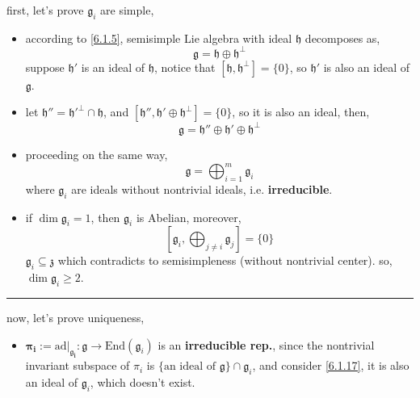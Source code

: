\begin{itemize}
	\begin{tcolorbox}[title=proof:]
		first, let's prove $\mathfrak{g}_i$ are simple,
		\begin{itemize}
			\item according to \eqref{6.1.5}, semisimple Lie algebra with ideal $\mathfrak{h}$ decomposes as,
			\begin{equation}
				\mathfrak{g} = \mathfrak{h} \oplus \mathfrak{h}^\perp
			\end{equation}
			suppose $\mathfrak{h}'$ is an ideal of $\mathfrak{h}$, notice that $[\mathfrak{h}, \mathfrak{h}^\perp] = \{0\}$, so $\mathfrak{h}'$ is also an ideal of $\mathfrak{g}$.
			
			\item let $\mathfrak{h}'' = \mathfrak{h}'^\perp \cap \mathfrak{h}$, and $[\mathfrak{h}'', \mathfrak{h}' \oplus \mathfrak{h}^\perp] = \{0\}$, so it is also an ideal, then,
			\begin{equation}
				\mathfrak{g} = \mathfrak{h}'' \oplus \mathfrak{h}' \oplus \mathfrak{h}^\perp
			\end{equation}
			
			\item proceeding on the same way,
			\begin{equation}
				\mathfrak{g} = \bigoplus_{i = 1}^m \mathfrak{g}_i
			\end{equation}
			where $\mathfrak{g}_i$ are ideals without nontrivial ideals, i.e. \textbf{irreducible}.
			
			\item if $\dim \mathfrak{g}_i = 1$, then $\mathfrak{g}_i$ is Abelian, moreover,
			\begin{equation} \label{6.1.17}
				[\mathfrak{g}_i, \bigoplus_{j \neq i} \mathfrak{g}_j] = \{0\}
			\end{equation}
			$\mathfrak{g}_i \subseteq \mathfrak{z}$ which contradicts to semisimpleness (without nontrivial center). so, $\dim \mathfrak{g}_i \geq 2$.
		\end{itemize}
		
		\noindent\rule[0.5ex]{\linewidth}{0.5pt} %
		
		now, let's prove uniqueness,
		\begin{itemize}
			\item $\boldsymbol{\pi_i := \mathrm{ad} \big|_{\mathfrak{g}_i}} : \mathfrak{g} \rightarrow \mathrm{End}(\mathfrak{g}_i)$ is an \textbf{irreducible rep.}, since the nontrivial invariant subspace of $\pi_i$ is $\{\text{an ideal of } \mathfrak{g}\} \cap \mathfrak{g}_i$, and consider \eqref{6.1.17}, it is also an ideal of $\mathfrak{g}_i$, which doesn't exist.
			

\end{itemize}
\end{tcolorbox}
\end{itemize}
